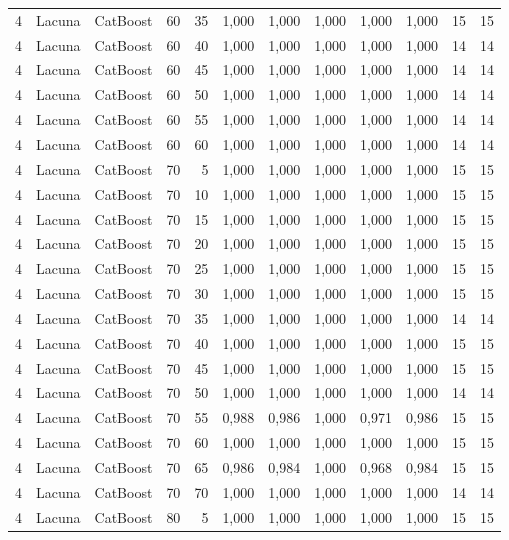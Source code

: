 \begin{longtable}{ccclrrrrrrrr}
4 & Lacuna & CatBoost & 60 & 35 & 1,000 & 1,000 & 1,000 & 1,000 & 1,000 & 15 & 15 \\
4 & Lacuna & CatBoost & 60 & 40 & 1,000 & 1,000 & 1,000 & 1,000 & 1,000 & 14 & 14 \\
4 & Lacuna & CatBoost & 60 & 45 & 1,000 & 1,000 & 1,000 & 1,000 & 1,000 & 14 & 14 \\
4 & Lacuna & CatBoost & 60 & 50 & 1,000 & 1,000 & 1,000 & 1,000 & 1,000 & 14 & 14 \\
4 & Lacuna & CatBoost & 60 & 55 & 1,000 & 1,000 & 1,000 & 1,000 & 1,000 & 14 & 14 \\
4 & Lacuna & CatBoost & 60 & 60 & 1,000 & 1,000 & 1,000 & 1,000 & 1,000 & 14 & 14 \\
4 & Lacuna & CatBoost & 70 & 5 & 1,000 & 1,000 & 1,000 & 1,000 & 1,000 & 15 & 15 \\
4 & Lacuna & CatBoost & 70 & 10 & 1,000 & 1,000 & 1,000 & 1,000 & 1,000 & 15 & 15 \\
4 & Lacuna & CatBoost & 70 & 15 & 1,000 & 1,000 & 1,000 & 1,000 & 1,000 & 15 & 15 \\
4 & Lacuna & CatBoost & 70 & 20 & 1,000 & 1,000 & 1,000 & 1,000 & 1,000 & 15 & 15 \\
4 & Lacuna & CatBoost & 70 & 25 & 1,000 & 1,000 & 1,000 & 1,000 & 1,000 & 15 & 15 \\
4 & Lacuna & CatBoost & 70 & 30 & 1,000 & 1,000 & 1,000 & 1,000 & 1,000 & 15 & 15 \\
4 & Lacuna & CatBoost & 70 & 35 & 1,000 & 1,000 & 1,000 & 1,000 & 1,000 & 14 & 14 \\
4 & Lacuna & CatBoost & 70 & 40 & 1,000 & 1,000 & 1,000 & 1,000 & 1,000 & 15 & 15 \\
4 & Lacuna & CatBoost & 70 & 45 & 1,000 & 1,000 & 1,000 & 1,000 & 1,000 & 15 & 15 \\
4 & Lacuna & CatBoost & 70 & 50 & 1,000 & 1,000 & 1,000 & 1,000 & 1,000 & 14 & 14 \\
4 & Lacuna & CatBoost & 70 & 55 & 0,988 & 0,986 & 1,000 & 0,971 & 0,986 & 15 & 15 \\
4 & Lacuna & CatBoost & 70 & 60 & 1,000 & 1,000 & 1,000 & 1,000 & 1,000 & 15 & 15 \\
4 & Lacuna & CatBoost & 70 & 65 & 0,986 & 0,984 & 1,000 & 0,968 & 0,984 & 15 & 15 \\
4 & Lacuna & CatBoost & 70 & 70 & 1,000 & 1,000 & 1,000 & 1,000 & 1,000 & 14 & 14 \\
4 & Lacuna & CatBoost & 80 & 5 & 1,000 & 1,000 & 1,000 & 1,000 & 1,000 & 15 & 15 \\

\end{longtable}
